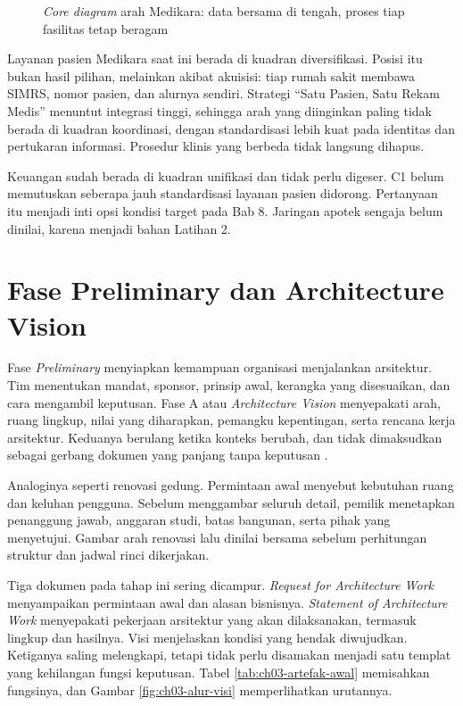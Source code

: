 \begin{figure}[!htb]
  \centering
  
  \caption{\textit{Core diagram} arah Medikara: data bersama di tengah, proses
           tiap fasilitas tetap beragam}
  \label{fig:ch03-core-diagram}
\end{figure}

\begin{kasus}[title={Kasus Medikara Health: Posisi Saat Ini dan Arah yang Diinginkan}]
  Layanan pasien Medikara saat ini berada di kuadran diversifikasi. Posisi itu
  bukan hasil pilihan, melainkan akibat akuisisi: tiap rumah sakit membawa SIMRS,
  nomor pasien, dan alurnya sendiri. Strategi ``Satu Pasien, Satu Rekam Medis''
  menuntut integrasi tinggi, sehingga arah yang diinginkan paling tidak berada di
  kuadran koordinasi, dengan standardisasi lebih kuat pada identitas dan
  pertukaran informasi. Prosedur klinis yang berbeda tidak langsung dihapus.

  Keuangan sudah berada di kuadran unifikasi dan tidak perlu digeser. C1 belum
  memutuskan seberapa jauh standardisasi layanan pasien didorong. Pertanyaan itu
  menjadi inti opsi kondisi target pada Bab 8. Jaringan apotek sengaja belum
  dinilai, karena menjadi bahan Latihan 2.
\end{kasus}

\section{Fase Preliminary dan Architecture Vision}

Fase \textit{Preliminary} menyiapkan kemampuan organisasi menjalankan arsitektur.
Tim menentukan mandat, sponsor, prinsip awal, kerangka yang disesuaikan, dan cara
mengambil keputusan. Fase A atau \textit{Architecture Vision} menyepakati arah,
ruang lingkup, nilai yang diharapkan, pemangku kepentingan, serta rencana kerja
arsitektur. Keduanya berulang ketika konteks berubah, dan tidak dimaksudkan
sebagai gerbang dokumen yang panjang tanpa keputusan \cite{togaf10}.

Analoginya seperti renovasi gedung. Permintaan awal menyebut kebutuhan ruang dan
keluhan pengguna. Sebelum menggambar seluruh detail, pemilik menetapkan penanggung
jawab, anggaran studi, batas bangunan, serta pihak yang menyetujui. Gambar arah
renovasi lalu dinilai bersama sebelum perhitungan struktur dan jadwal rinci
dikerjakan.

Tiga dokumen pada tahap ini sering dicampur. \textit{Request for Architecture
Work} menyampaikan permintaan awal dan alasan bisnisnya. \textit{Statement of
Architecture Work} menyepakati pekerjaan arsitektur yang akan dilaksanakan,
termasuk lingkup dan hasilnya. Visi menjelaskan kondisi yang hendak diwujudkan.
Ketiganya saling melengkapi, tetapi tidak perlu disamakan menjadi satu templat
yang kehilangan fungsi keputusan. Tabel \ref{tab:ch03-artefak-awal} memisahkan
fungsinya, dan Gambar \ref{fig:ch03-alur-visi} memperlihatkan urutannya.


